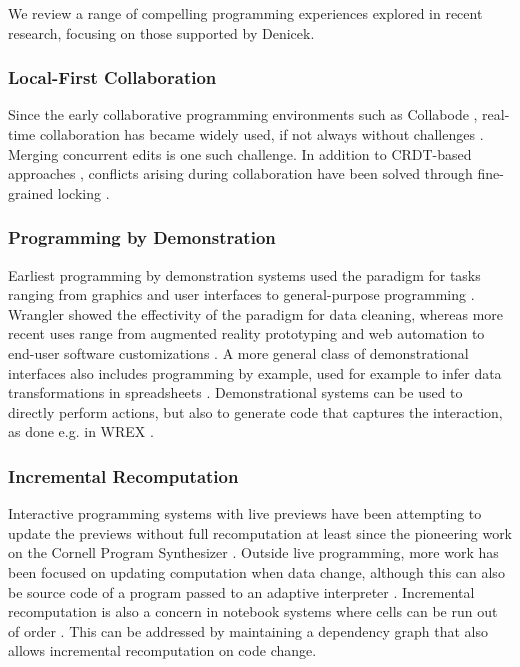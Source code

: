 \documentclass[sigconf,anonymous,screen]{acmart}
\begin{document}
We review a range of compelling programming experiences explored in recent research,
focusing on those supported by Denicek.

\subsubsection*{Local-First Collaboration}
Since the early collaborative programming environments such as Collabode \cite{goldman-2011-collaborative},
real-time collaboration has became widely used, if not always without challenges \cite{tan-2024-vslive}.
Merging concurrent edits is one such challenge.
In addition to CRDT-based approaches \cite{klokmose-2024-mywebstrates}, conflicts arising during
collaboration have been solved through fine-grained locking \cite{wang-2024-nbconflicts}.

\subsubsection*{Programming by Demonstration}
Earliest programming by demonstration systems used the paradigm for tasks ranging from graphics
and user interfaces to general-purpose programming \cite{smith-1975-pygmalion,cypher-1993-pbd}.
Wrangler \cite{kandel-2011-wrangler} showed the effectivity of the paradigm for data cleaning,
whereas more recent uses range from augmented reality prototyping \cite{leiva-2021-rapido}
and web automation \cite{chen-2023-miwa} to end-user software customizations
\cite{litt-2020-customization,litt-2020-wildcard}. A more general class of demonstrational
interfaces \cite{myers-2000-demonstrational} also includes programming by example, used
for example to infer data transformations in spreadsheets \cite{gulwani-2012-spreadsheets}.
Demonstrational systems can be used to directly perform actions, but also to generate code
that captures the interaction, as done e.g. in WREX \cite{drossos-2020-wrex}.

\subsubsection*{Incremental Recomputation}
Interactive programming systems with live previews \cite{petricek-2020-live,mcdirmid-2013-usable}
have been attempting to update the previews without full recomputation at least since the pioneering
work on the Cornell Program Synthesizer \cite{teitelbaum-1981-cps}. Outside live programming,
more work has been focused on updating computation when data change, although this can also
be source code of a program passed to an adaptive interpreter \cite{acar-2006-adaptive}.
Incremental recomputation is also a concern in notebook systems where cells can be run out of
order \cite{singer-2020-jollity}. This can be addressed by maintaining a dependency graph
\cite{petricek-2018-wrattler,koop-2017-dataflow} that also allows incremental recomputation
on code change.
\end{document}
